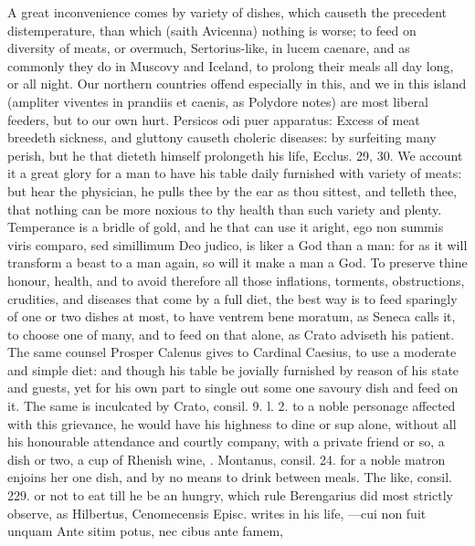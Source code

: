 {A great inconvenience comes by variety of dishes, which causeth the
precedent distemperature, than which (saith Avicenna) nothing is
worse; to feed on diversity of meats, or overmuch, Sertorius-like, in
lucem caenare, and as commonly they do in Muscovy and Iceland, to
prolong their meals all day long, or all night. Our northern countries
offend especially in this, and we in this island (ampliter viventes in
prandiis et caenis, as Polydore notes) are most liberal feeders,
but to our own hurt. Persicos odi puer apparatus: Excess of meat
breedeth sickness, and gluttony causeth choleric diseases: by
surfeiting many perish, but he that dieteth himself prolongeth his
life, Ecclus.  29, 30. We account it a great glory for a man to
have his table daily furnished with variety of meats: but hear the
physician, he pulls thee by the ear as thou sittest, and telleth thee,
that nothing can be more noxious to thy health than such variety
and plenty. Temperance is a bridle of gold, and he that can use it
aright, ego non summis viris comparo, sed simillimum Deo judico,
is liker a God than a man: for as it will transform a beast to a man
again, so will it make a man a God. To preserve thine honour, health,
and to avoid therefore all those inflations, torments, obstructions,
crudities, and diseases that come by a full diet, the best way is to
feed sparingly of one or two dishes at most, to have ventrem bene
moratum, as Seneca calls it, to choose one of many, and to feed
on that alone, as Crato adviseth his patient. The same counsel
Prosper Calenus gives to Cardinal Caesius, to use a moderate and
simple diet: and though his table be jovially furnished by reason of
his state and guests, yet for his own part to single out some one
savoury dish and feed on it. The same is inculcated by Crato,
consil. 9. l. 2. to a noble personage affected with this grievance, he
would have his highness to dine or sup alone, without all his
honourable attendance and courtly company, with a private friend or so,
a dish or two, a cup of Rhenish wine, \etc{}. Montanus, consil. 24.
for a noble matron enjoins her one dish, and by no means to drink
between meals. The like, consil. 229. or not to eat till he be an
hungry, which rule Berengarius did most strictly observe, as Hilbertus,
Cenomecensis Episc. writes in his life,
---cui non fuit unquam
Ante sitim potus, nec cibus ante famem,

}
